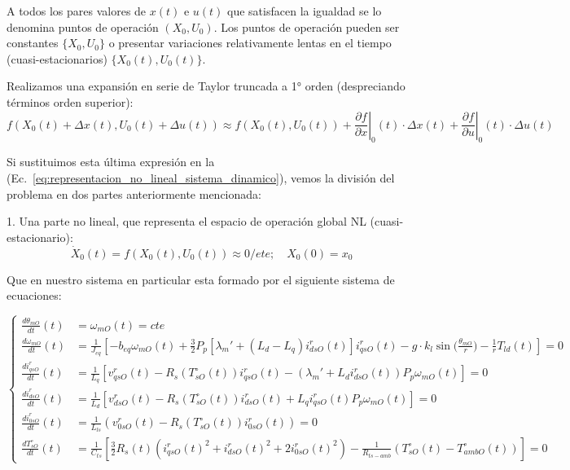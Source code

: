 \documentclass{article}
\begin{document}
A todos los pares valores de $x(t)$ e $u(t)$ que satisfacen la igualdad se lo denomina puntos de operación $(X_0,U_0)$. Los puntos de operación pueden ser constantes $\{X_0,U_0\}$ o presentar variaciones relativamente lentas en el tiempo (cuasi-estacionarios) $\{X_0(t),U_0(t)\}$.

Realizamos una expansión en serie de Taylor truncada a 1° orden (despreciando términos orden superior):
\begin{equation}
f(X_0(t) + \Delta x(t), U_0(t) + \Delta u(t)) \approx f(X_0(t),U_0(t)) + \left.\frac{\partial f}{\partial x}\right|_0 (t) \cdot \Delta x(t) + \left.\frac{\partial f}{\partial u}\right|_0 (t) \cdot \Delta u(t)
\end{equation}

Si sustituimos esta última expresión en la (Ec.~\ref{eq:representacion_no_lineal_sistema_dinamico}), vemos la división del problema en dos partes anteriormente mencionada:

1. Una parte no lineal, que representa el espacio de operación global NL (cuasi-estacionario):
  \begin{equation}
  \dot{X}_0(t) = f(X_0(t),U_0(t)) \approx 0/ete; \quad X_0(0) = x_0
  \label{Ec.25}
  \end{equation}

Que en nuestro sistema en particular esta formado por el siguiente sistema de ecuaciones:

\begin{equation}
\left\{
\begin{aligned}
\frac{d\theta_{mO}}{dt}(t) &= \omega_{mO}(t) = cte \\
\frac{d\omega_{mO}}{dt}(t) &= \frac{1}{J_{eq}}\left[-b_{eq}\omega_{mO}(t) + \frac{3}{2}P_p[\lambda_m' + (L_d - L_q)i^r_{dsO}(t)]i^r_{qsO}(t) - g \cdot k_l \sin\Bigg(\frac{\theta_{mO}}{r}\Bigg) - \frac{1}{r} T_{ld}(t)\right] = 0 \\
\frac{di^r_{qsO}}{dt}(t) &= \frac{1}{L_q}\left[v^r_{qsO}(t) - R_s(T^\circ_{sO}(t))i^r_{qsO}(t) - (\lambda_m' + L_di^r_{dsO}(t))P_p\omega_{mO}(t)\right] = 0 \\
\frac{di^r_{dsO}}{dt}(t) &= \frac{1}{L_d}\left[v^r_{dsO}(t) - R_s(T^\circ_{sO}(t))i^r_{dsO}(t) + L_qi^r_{qsO}(t)P_p\omega_{mO}(t)\right] = 0 \\
\frac{di^r_{0sO}}{dt}(t) &= \frac{1}{L_{ls}}(v^r_{0sO}(t) - R_s(T^\circ_{sO}(t))i^r_{0sO}(t)) = 0 \\
\frac{dT^\circ_{sO}}{dt}(t) &= \frac{1}{C_{ts}}\left[\frac{3}{2}R_s(t)(i^r_{qsO}(t)^2 + i^r_{dsO}(t)^2 + 2i^r_{0sO}(t)^2) - \frac{1}{R_{ts-amb}}(T^\circ_{sO}(t) - T^\circ_{ambO}(t))\right] = 0 
\end{aligned}
\right.
\end{equation}
\end{document}
